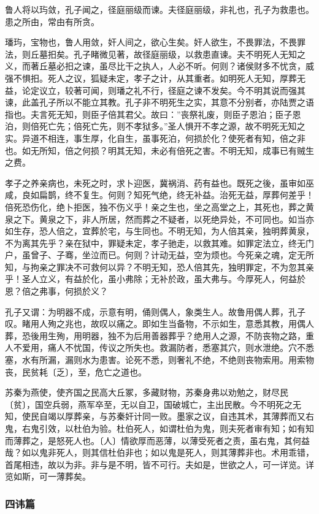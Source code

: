 \documentclass[]{article}
\begin{document}
鲁人将以玙敛，孔子闻之，径庭丽级而谏。夫径庭丽级，非礼也，孔子为救患也。患之所由，常由有所贪。

璠玙，宝物也，鲁人用敛，奸人间之，欲心生矣。奸人欲生，不畏罪法，不畏罪法，则丘墓抇矣。孔子睹微见著，故径庭丽级，以救患直谏。夫不明死人无知之义，而著丘墓必抇之谏，虽尽比干之执人，人必不听。何则？诸侯财多不忧贪，威强不惧抇。死人之议，狐疑未定，孝子之计，从其重者。如明死人无知，厚葬无益，论定议立，较著可闻，则璠之礼不行，径庭之谏不发矣。今不明其说而强其谏，此盖孔子所以不能立其教。孔子非不明死生之实，其意不分别者，亦陆贾之语指也。夫言死无知，则臣子倍其君父。故曰：''丧祭礼废，则臣子恩泊；臣子恩泊，则倍死亡先；倍死亡先，则不孝狱多。''圣人惧开不孝之源，故不明死无知之实。异道不相连，事生厚，化自生，虽事死泊，何损於化？使死者有知，倍之非也。如无所知，倍之何损？明其无知，未必有倍死之害。不明无知，成事已有贼生之费。

孝子之养亲病也，未死之时，求卜迎医，冀祸消、药有益也。既死之後，虽审如巫咸，良如扁鹊，终不复生。何则？知死气绝，终无补益。治死无益，厚葬何差乎！倍死恐伤化，绝卜拒医，独不伤义乎！亲之生也，坐之高堂之上，其死也，葬之黄泉之下。黄泉之下，非人所居，然而葬之不疑者，以死绝异处，不可同也。如当亦如生存，恐人倍之，宜葬於宅，与生同也。不明无知，为人倍其亲，独明葬黄泉，不为离其先乎？亲在狱中，罪疑未定，孝子驰走，以救其难。如罪定法立，终无门户，虽曾子、子骞，坐泣而已。何则？计动无益，空为烦也。今死亲之魂，定无所知，与拘亲之罪决不可救何以异？不明无知，恐人倍其先，独明罪定，不为忽其亲乎！圣人立义，有益於化，虽小弗除；无补於政，虽大弗与。今厚死人，何益於恩？倍之弗事，何损於义？

孔子又谓：为明器不成，示意有明，俑则偶人，象类生人。故鲁用偶人葬，孔子叹。睹用人殉之兆也，故叹以痛之。即如生当备物，不示如生，意悉其教，用偶人葬，恐後用生殉，用明器，独不为后用善器葬乎？绝用人之源，不防丧物之路，重人不爱用，痛人不忧国，传议之所失也。救漏防者，悉塞其穴，则水泄绝。穴不悉塞，水有所漏，漏则水为患害。论死不悉，则奢礼不绝，不绝则丧物索用。用索物丧，民贫耗〔乏〕，至，危亡之道也。

苏秦为燕使，使齐国之民高大丘冢，多藏财物，苏秦身弗以劝勉之，财尽民〔贫〕，国空兵弱，燕军卒至，无以自卫，国破城亡，主出民散。今不明死之无知，使民自竭以厚葬亲，与苏秦奸计同一败。墨家之议，自违其术，其薄葬而又右鬼，右鬼引效，以杜伯为验。杜伯死人，如谓杜伯为鬼，则夫死者审有知；如有知而薄葬之，是怒死人也。〔人〕情欲厚而恶薄，以薄受死者之责，虽右鬼，其何益哉？如以鬼非死人，则其信杜伯非也；如以鬼是死人，则其薄葬非也。术用乖错，首尾相违，故以为非。非与是不明，皆不可行。夫如是，世欲之人，可一详览。详览如斯，可一薄葬矣。

\hypertarget{header-n828}{%
\subsubsection{四讳篇}\label{header-n828}}
\end{document}
